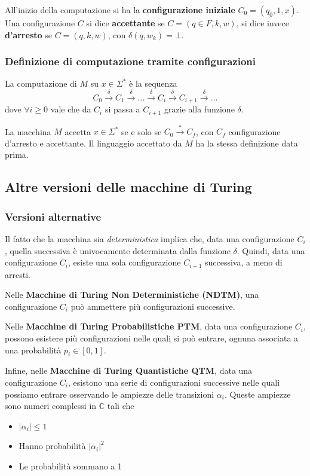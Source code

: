 All'inizio della computazione si ha la \textbf{configurazione iniziale} $C_0 = (q_0, 1, x)$. Una configurazione $C$ si dice \textbf{accettante} se $C = (q \in F, k, w)$, si dice invece \textbf{d'arresto} se $C = (q, k, w)$, con $\delta (q,w_{k}) = \bot$.

\subsubsection{Definizione di computazione tramite configurazioni}

La computazione di $M$ su $x \in \Sigma^\ast$ è la sequenza
$$ C_0 \xrightarrow{\delta} C_1 \xrightarrow{\delta} \dots \xrightarrow{\delta} C_i \xrightarrow{\delta} C_{i+1} \xrightarrow{\delta} \dots $$
dove $\forall i \geq 0$ vale che da $C_i$ si passa a $C_{i+1}$ grazie alla funzione $\delta$.

La macchina $M$ accetta $x \in \Sigma^\ast$ se e solo se $C_0 \xrightarrow{\ast}C_f$, con $C_f$ configurazione d'arresto e accettante. Il linguaggio accettato da $M$ ha la stessa definizione data prima.

\subsection{Altre versioni delle macchine di Turing}

\subsubsection{Versioni alternative}

Il fatto che la macchina sia \textit{deterministica} implica che, data una configurazione $C_i$, quella successiva è univocamente determinata dalla funzione $\delta$. Quindi, data una configurazione $C_i$, esiste una sola configurazione $C_{i+1}$ successiva, a meno di arresti.

Nelle \textbf{Macchine di Turing Non Deterministiche (NDTM)}, una configurazione $C_i$ può ammettere più configurazioni successive.

Nelle \textbf{Macchine di Turing Probabilistiche PTM}, data una configurazione $C_i$, possono esistere più configurazioni nelle quali si può entrare, ognuna associata a una probabilità $p_i \in [0,1]$.

Infine, nelle \textbf{Macchine di Turing Quantistiche QTM}, data una configurazione $C_i$, esistono una serie di configurazioni successive nelle quali possiamo entrare osservando le ampiezze delle transizioni $\alpha_i$. Queste ampiezze sono numeri complessi in $\mathbb{C}$ tali che
\begin{itemize}
	\item $|\alpha_i| \leq 1$
	
    \item Hanno probabilità $|\alpha_i|^2$
	
    \item Le probabilità sommano a 1
\end{itemize}

